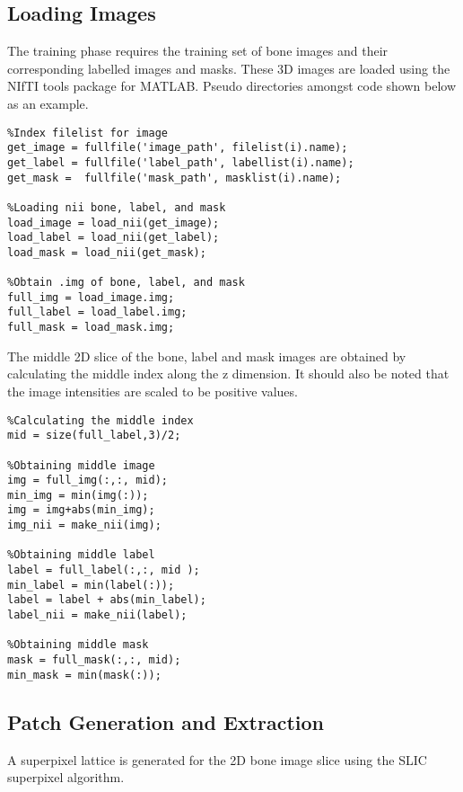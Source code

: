 \subsection{Loading Images} 
The training phase requires the training set of bone images and their corresponding labelled images and masks. These 3D images are loaded using the NIfTI tools package \cite{ref:nifti_1} for MATLAB. Pseudo directories amongst code shown below as an example. 
\begin{lstlisting}
%Index filelist for image
get_image = fullfile('image_path', filelist(i).name);
get_label = fullfile('label_path', labellist(i).name);
get_mask =  fullfile('mask_path', masklist(i).name);
    
%Loading nii bone, label, and mask
load_image = load_nii(get_image);
load_label = load_nii(get_label);
load_mask = load_nii(get_mask); 

%Obtain .img of bone, label, and mask
full_img = load_image.img;
full_label = load_label.img;
full_mask = load_mask.img;
\end{lstlisting}


\medskip
The middle 2D slice of the bone, label and mask images are obtained by calculating the middle index along the z dimension. It should also be noted that the image intensities are scaled to be positive values.  

\begin{lstlisting}
%Calculating the middle index
mid = size(full_label,3)/2;

%Obtaining middle image
img = full_img(:,:, mid);
min_img = min(img(:));
img = img+abs(min_img);
img_nii = make_nii(img);

%Obtaining middle label
label = full_label(:,:, mid );
min_label = min(label(:));
label = label + abs(min_label);
label_nii = make_nii(label);

%Obtaining middle mask
mask = full_mask(:,:, mid);
min_mask = min(mask(:));
\end{lstlisting}

\subsection{Patch Generation and Extraction}
A superpixel lattice is generated for the 2D bone image slice using the SLIC superpixel algorithm. 

